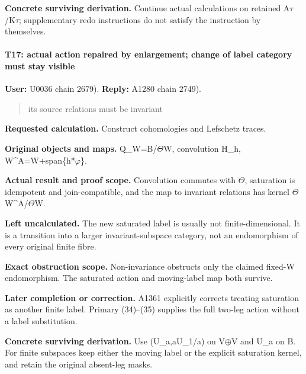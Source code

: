 \textbf{Concrete surviving derivation.} Continue actual calculations on
retained
A\allowbreak{}\ensuremath{τ}\allowbreak{}/K\allowbreak{}\ensuremath{τ}\allowbreak{};
supplementary redo instructions do not satisfy the instruction by
themselves.

\paragraph{T17: actual action repaired by enlargement; change of label
category must stay
visible}\label{t17-actual-action-repaired-by-enlargement-change-of-label-category-must-stay-visible}

\textbf{User:} U0036
\protect{} chain 2679).
\textbf{Reply:} A1280
\protect{} chain 2749).

\begin{quote}
its source relations must be invariant
\end{quote}

\textbf{Requested calculation.} Construct cohomologies and Lefschetz
traces.

\textbf{Original objects and maps.}
Q\_W=B/\allowbreak{}\ensuremath{Θ}\allowbreak{}W, convolution H\_h,
W\textasciicircum{}A=W+span\{h*\allowbreak{}\ensuremath{φ}\allowbreak{}\}.

\textbf{Actual result and proof scope.} Convolution commutes with
\allowbreak{}\ensuremath{Θ}\allowbreak{}, saturation is idempotent and
join-compatible, and the map to invariant relations has kernel
\allowbreak{}\ensuremath{Θ}\allowbreak{}W\textasciicircum{}A/\allowbreak{}\ensuremath{Θ}\allowbreak{}W.

\textbf{Left uncalculated.} The new saturated label is usually not
finite-dimensional. It is a transition into a larger invariant-subspace
category, not an endomorphism of every original finite fibre.

\textbf{Exact obstruction scope.} Non-invariance obstructs only the
claimed fixed-W endomorphism. The saturated action and moving-label map
both survive.

\textbf{Later completion or correction.} A1361 explicitly corrects
treating saturation as another finite label. Primary (34)--(35) supplies
the full two-leg action without a label substitution.

\textbf{Concrete surviving derivation.} Use (U\_a,aU\_1/a) on
V\allowbreak{}\ensuremath{⊕}\allowbreak{}V and U\_a on B. For finite
subspaces keep either the moving label or the explicit saturation
kernel, and retain the original absent-leg masks.

